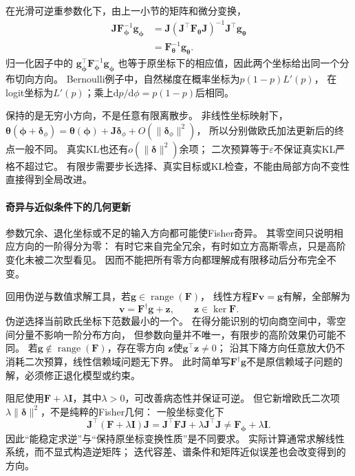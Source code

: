 在光滑可逆重参数化下，由上一小节的矩阵和微分变换，
\[
\begin{aligned}
  \bm J\bm F_{\bm\phi}^{-1}\bm g_{\bm\phi}
  &=\bm J(\bm J^\top\bm F_{\bm\theta}\bm J)^{-1}
    \bm J^\top\bm g_{\bm\theta}\\
  &=\bm F_{\bm\theta}^{-1}\bm g_{\bm\theta}.
\end{aligned}
\]
归一化因子中的
\(\bm g_{\bm\phi}^\top\bm F_{\bm\phi}^{-1}\bm g_{\bm\phi}\)
也等于原坐标下的相应值，因此两个坐标给出同一个分布切向方向。
Bernoulli例子中，自然梯度在概率坐标为\(p(1-p)L'(p)\)，
在logit坐标为\(L'(p)\)；乘上\(\mathrm dp/\mathrm d\phi=p(1-p)\)后相同。

保持的是无穷小方向，不是任意有限离散步。
非线性坐标映射下，
\(\bm\theta(\bm\phi+\bm\delta_\phi)
=\bm\theta(\bm\phi)+\bm J\bm\delta_\phi+O(\|\bm\delta_\phi\|^2)\)，
所以分别做欧氏加法更新后的终点一般不同。
真实KL也还有\(o(\|\bm\delta\|^2)\)余项；
二次预算等于\(\varepsilon\)不保证真实KL严格不超过它。
有限步需要步长选择、真实目标或KL检查，不能由局部方向不变性直接得到全局改进。

\paragraph{奇异与近似条件下的几何更新}
\label{sec:information-singular-approximate-update}

参数冗余、退化坐标或不足的输入方向都可能使Fisher奇异。
其零空间只说明相应方向的一阶得分为零：
有时它来自完全冗余，有时如立方高斯零点，只是高阶变化未被二次型看见。
因而不能把所有零方向都理解成有限移动后分布完全不变。

回用伪逆与数值求解工具，若\(\bm g\in\operatorname{range}(\bm F)\)，
线性方程\(\bm F\bm v=\bm g\)有解，全部解为
\[
  \bm v=\bm F^\dagger\bm g+\bm z,\qquad
  \bm z\in\ker\bm F.
\]
伪逆选择当前欧氏坐标下范数最小的一个。
在得分能识别的切向商空间中，零空间分量不影响一阶分布方向，
但参数向量并不唯一，有限步的高阶效果仍可能不同。
若\(\bm g\notin\operatorname{range}(\bm F)\)，存在零方向
\(\bm z\)使\(\bm g^\top\bm z\neq0\)；
沿其下降方向任意放大仍不消耗二次预算，线性信赖域问题无下界。
此时简单写\(\bm F^\dagger\bm g\)不是原信赖域子问题的解，必须修正退化模型或约束。

阻尼使用\(\bm F+\lambda\bm I\)，其中\(\lambda>0\)，可改善病态性并保证可逆。
但它新增欧氏二次项\(\lambda\|\bm\delta\|^2\)，不是纯粹的Fisher几何：
一般坐标变化下
\[
  \bm J^\top(\bm F+\lambda\bm I)\bm J
  =\bm J^\top\bm F\bm J+\lambda\bm J^\top\bm J
  \neq\bm F_{\bm\phi}+\lambda\bm I.
\]
因此“能稳定求逆”与“保持原坐标变换性质”是不同要求。
实际计算通常求解线性系统，而不显式构造逆矩阵；
迭代容差、谱条件和矩阵近似误差也会改变得到的方向。

